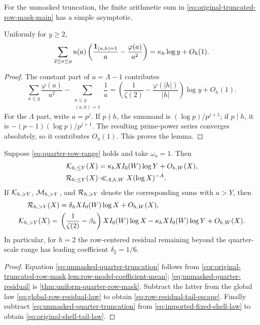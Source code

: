 For the unmasked truncation, the finite arithmetic sum in
\eqref{eq:original-truncated-row-mask-main} has a simple asymptotic.

\begin{lemma}
\label{lem:row-model-coefficient-mean}
Uniformly for $y\geq2$,
\begin{equation}
 \sum_{2\leq a\leq y}u(a)
 \left(
  \frac{\mathbf 1_{(a,h)=1}}a-\frac{\varphi(a)}{a^2}
 \right)
 =\kappa_h\log y+O_h(1).
 \label{eq:row-model-coefficient-mean}
\end{equation}
\end{lemma}

\begin{proof}
The constant part of $u=\Lambda-1$ contributes
\[
 \sum_{a\leq y}\frac{\varphi(a)}{a^2}
 -\sum_{\substack{a\leq y\\(a,h)=1}}\frac1a
 =\left(\frac1{\zeta(2)}-\frac{\varphi(|h|)}{|h|}\right)
 \log y+O_h(1).
\]
For the $\Lambda$ part, write $a=p^j$.  If $p\nmid h$, the summand is
$(\log p)/p^{j+1}$; if $p\mid h$, it is
$-(p-1)(\log p)/p^{j+1}$.  The resulting prime-power series converges
absolutely, so it contributes $O_h(1)$.  This proves the lemma.
\end{proof}

\begin{corollary}
\label{cor:quarter-tail-mass-escape}
Suppose \eqref{eq:quarter-row-range} holds and take
$\omega_a=1$.  Then
\begin{align}
 \mathcal K_{h,\leq Y}(X)
 &=\kappa_hXI_0(W)\log Y+O_{h,W}(X),
 \label{eq:unmasked-quarter-truncation}\\
 \mathcal R_{h,\leq Y}(X)
 &\ll_{A,h,W}X(\log X)^{-A}.
 \label{eq:unmasked-quarter-residual}
\end{align}
If $\mathcal K_{h,>Y}$, $\mathcal M_{h,>Y}$, and $\mathcal R_{h,>Y}$ denote the corresponding
sums with $a>Y$, then
\begin{align}
 \mathcal R_{h,>Y}(X)
 &=\delta_hXI_0(W)\log X+O_{h,W}(X),
 \label{eq:row-residual-tail-escape}\\
 \mathcal K_{h,>Y}(X)
 ={}&\left(\frac1{\zeta(2)}-\beta_h\right)
 XI_0(W)\log X
 -\kappa_hXI_0(W)\log Y
 +O_{h,W}(X).
 \label{eq:original-shell-tail-law}
\end{align}
In particular, for $h=2$ the row-centered residual remaining beyond the
quarter-scale range has leading coefficient $\delta_2=1/6$.
\end{corollary}

\begin{proof}
Equation \eqref{eq:unmasked-quarter-truncation} follows from
\cref{cor:original-truncated-row-mask,lem:row-model-coefficient-mean};
\eqref{eq:unmasked-quarter-residual} is
\cref{thm:uniform-quarter-row-mask}.  Subtract the latter from the global
law \eqref{eq:global-row-residual-law} to obtain
\eqref{eq:row-residual-tail-escape}.  Finally subtract
\eqref{eq:unmasked-quarter-truncation} from
\eqref{eq:imported-fixed-shell-law} to obtain
\eqref{eq:original-shell-tail-law}.
\end{proof}

